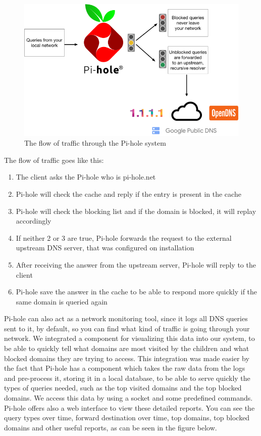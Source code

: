 \begin{figure}[th]
\centering
\includegraphics[width=1\textwidth]{Figures/pihole-dns}
\decoRule
\caption{The flow of traffic through the Pi-hole system}
\label{fig:circle}
\end{figure}

The flow of traffic goes like this:
\begin{enumerate}
\item The client asks the Pi-hole who is pi-hole.net
\item Pi-hole will check the cache and reply if the entry is present in the cache
\item Pi-hole will check the blocking list and if the domain is blocked, it will replay accordingly
\item If neither 2 or 3 are true, Pi-hole forwards the request to the external upstream DNS server, that was configured on installation
\item After receiving the answer from the upstream server, Pi-hole will reply to the client
\item Pi-hole save the answer in the cache to be able to respond more quickly if the same domain is queried again
\end{enumerate}

Pi-hole can also act as a network monitoring tool, since it logs all DNS queries sent to it, by default, so you can find what kind of traffic is going through your network. We integrated a component for visualizing this data into our system, to be able to quickly tell what domains are most visited by the children and what blocked domains they are trying to access. This integration was made easier by the fact that Pi-hole has a component which takes the raw data from the logs and pre-process it, storing it in a local database, to be able to serve quickly the types of queries needed, such as the top visited domains and the top blocked domains. We access this data by using a socket and some predefined commands. Pi-hole offers also a web interface to view these detailed reports. You can see the query types over time, forward destination over time, top domains, top blocked domains and other useful reports, as can be seen in the figure below.

